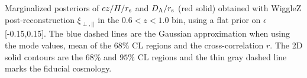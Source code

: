 \label{fig:HDA_z60_epsilon0.15} Marginalized posteriors of $cz/H/r_{\rm s}$ and $D_{\rm A}/r_{\rm s}$ (red solid) obtained with WiggleZ post-reconstruction $\xi_{\perp, ||}$ in the $0.6<z<1.0$ bin, using a flat prior on $\epsilon$ [-0.15,0.15]. The blue dashed lines are the Gaussian approximation when using the mode values, mean of the 68$\%$ CL regions and the cross-correlation $r$. The 2D solid contours are the $68\%$ and $95\%$ CL regions and the thin gray dashed line marks the fiducial cosmology. 